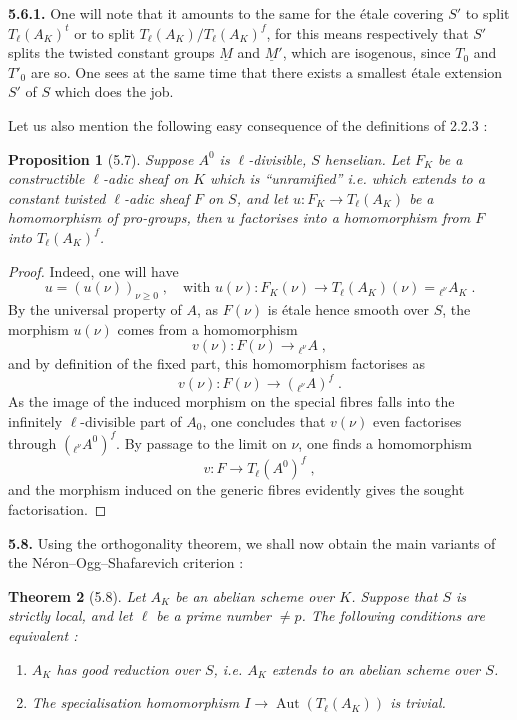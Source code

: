 \documentclass[11pt]{article}
\newtheorem{proposition}{Proposition}[section]
\newtheorem{theoreme}[proposition]{Theorem}
\newcommand{\Tl}{T_{\ell}}
\newcommand{\Aut}{\operatorname{Aut}}
\begin{document}
\noindent\textbf{5.6.1.} One will note that it amounts to the same for the
\'etale covering $S'$ to split $\Tl(A_K)^t$ or to split
$\Tl(A_K)/\Tl(A_K)^f$, for this means respectively that $S'$ splits the
twisted constant groups $\underline{M}$ and $\underline{M}'$, which are
isogenous, since $T_0$ and $T'_0$ are so. One sees at the same time that
there exists a smallest \'etale extension $S'$ of $S$ which does the job.

Let us also mention the following easy consequence of the definitions of
2.2.3 :

\begin{proposition}[5.7]
Suppose $A^0$ is $\ell$-divisible, $S$ henselian. Let $F_K$ be a
constructible $\ell$-adic sheaf on $K$ which is ``unramified'' i.e.
which extends to a constant twisted $\ell$-adic sheaf $F$ on $S$, and
let $u \colon F_K \to \Tl(A_K)$ be a homomorphism of pro-groups, then
$u$ factorises into a homomorphism from $F$ into $\Tl(A_K)^f$.
\end{proposition}

\begin{proof}
Indeed, one will have
\begin{equation}
u = (u(\nu))_{\nu \geq 0} \; , \quad
\text{with } u(\nu) \colon F_K(\nu) \longrightarrow
\Tl(A_K)(\nu) = {}_{\ell^{\nu}}\!A_K \; .
\end{equation}
By the universal property of $A$, as $F(\nu)$ is \'etale hence smooth
over $S$, the morphism $u(\nu)$ comes from a homomorphism
\[
v(\nu) \colon F(\nu) \longrightarrow {}_{\ell^{\nu}}\!A \; ,
\]
and by definition of the fixed part, this homomorphism factorises as
\[
v(\nu) \colon F(\nu) \longrightarrow ({}_{\ell^{\nu}}\!A)^f \; .
\]
As the image of the induced morphism on the special fibres falls into
the infinitely $\ell$-divisible part of $A_0$, one concludes that
$v(\nu)$ even factorises through $({}_{\ell^{\nu}}\!A^0)^f$. By passage
to the limit on $\nu$, one finds a homomorphism
\[
v \colon F \longrightarrow \Tl(A^0)^f \; ,
\]
and the morphism induced on the generic fibres evidently gives the
sought factorisation.
\end{proof}


\noindent\textbf{5.8.} Using the orthogonality theorem, we shall now
obtain the main variants of the N\'eron--Ogg--Shafarevich criterion :

\begin{theoreme}[5.8]
Let $A_K$ be an abelian scheme over $K$. Suppose that $S$ is strictly
local, and let $\ell$ be a prime number $\neq p$. The following
conditions are equivalent :
\begin{enumerate}[label=\emph{(\roman*)}]
\item $A_K$ has \emph{good reduction} over $S$, i.e. $A_K$ extends to an
abelian scheme over $S$.
\item The specialisation homomorphism $I \to \Aut(\Tl(A_K))$ is
\emph{trivial}.
\end{enumerate}
\end{theoreme}
\end{document}
